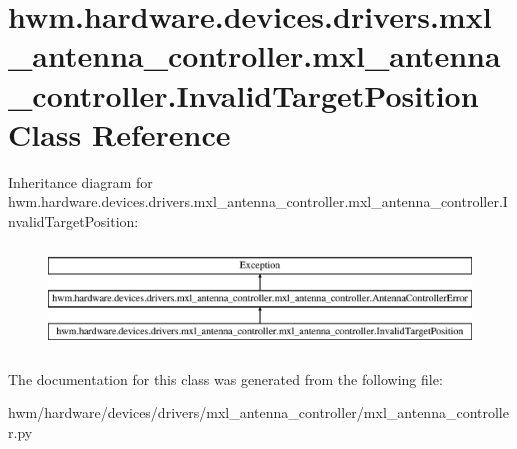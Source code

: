 \hypertarget{classhwm_1_1hardware_1_1devices_1_1drivers_1_1mxl__antenna__controller_1_1mxl__antenna__controller_1_1_invalid_target_position}{\section{hwm.\-hardware.\-devices.\-drivers.\-mxl\-\_\-antenna\-\_\-controller.\-mxl\-\_\-antenna\-\_\-controller.\-Invalid\-Target\-Position Class Reference}
\label{classhwm_1_1hardware_1_1devices_1_1drivers_1_1mxl__antenna__controller_1_1mxl__antenna__controller_1_1_invalid_target_position}
}
Inheritance diagram for hwm.\-hardware.\-devices.\-drivers.\-mxl\-\_\-antenna\-\_\-controller.\-mxl\-\_\-antenna\-\_\-controller.\-Invalid\-Target\-Position\-:\begin{figure}[H]
\begin{center}
\leavevmode
\includegraphics[height=2.790698cm]{classhwm_1_1hardware_1_1devices_1_1drivers_1_1mxl__antenna__controller_1_1mxl__antenna__controller_1_1_invalid_target_position}
\end{center}
\end{figure}


The documentation for this class was generated from the following file\-:\begin{DoxyCompactItemize}
\item 
hwm/hardware/devices/drivers/mxl\-\_\-antenna\-\_\-controller/mxl\-\_\-antenna\-\_\-controller.\-py\end{DoxyCompactItemize}
